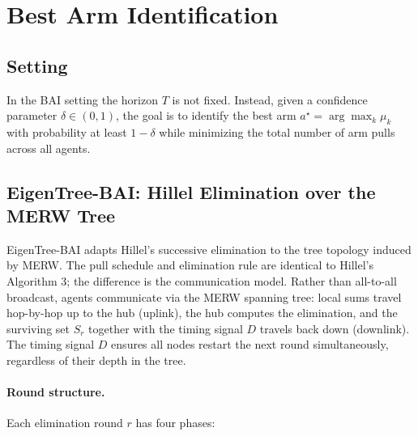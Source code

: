 \documentclass{article}
\newcommand{\merw}{EigenTree}
\begin{document}
\section{Best Arm Identification}
\label{sec:bai}

\subsection{Setting}

In the BAI setting the horizon $T$ is not fixed. Instead, given a confidence parameter $\delta \in (0,1)$, the goal is to identify the best arm $a^\star = \arg\max_k \mu_k$ with probability at least $1-\delta$ while minimizing the total number of arm pulls across all agents.

\subsection{\merw-BAI: Hillel Elimination over the MERW Tree}

\merw-BAI adapts Hillel's successive elimination to the tree topology induced by MERW. The pull schedule and elimination rule are identical to Hillel's Algorithm 3; the difference is the communication model. Rather than all-to-all broadcast, agents communicate via the MERW spanning tree: local sums travel hop-by-hop up to the hub (uplink), the hub computes the elimination, and the surviving set $S_r$ together with the timing signal $D$ travels back down (downlink). The timing signal $D$ ensures all nodes restart the next round simultaneously, regardless of their depth in the tree.

\paragraph{Round structure.} Each elimination round $r$ has four phases:
\end{document}
